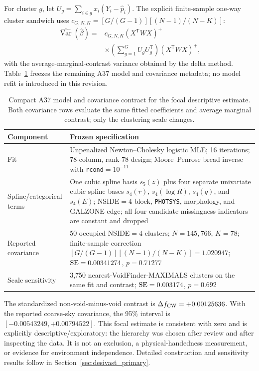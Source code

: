 \documentclass[aps,prd,twocolumn,superscriptaddress,showpacs,preprintnumbers,nofootinbib,longbibliography,floatfix]{revtex4-2}
\begin{document}
For cluster $g$, let
$U_g=\sum_{i\in g}x_i(Y_i-\widehat p_i)$. The explicit finite-sample
one-way cluster sandwich uses
$c_{G,N,K}=[G/(G-1)][(N-1)/(N-K)]$:
\begin{equation}
\begin{aligned}
\widehat{\operatorname{Var}}(\widehat\beta)
={}&c_{G,N,K}(X^{\mathsf T}WX)^{+} \\
&\times\left(\sum_{g=1}^{G}U_gU_g^{\mathsf T}\right)
(X^{\mathsf T}WX)^{+},
\end{aligned}
\label{eq:focal_sandwich}
\end{equation}
with the average-marginal-contrast variance obtained by the delta method.
Table~\ref{tab:focal_model_contract} freezes the remaining A37 model and
covariance metadata; no model refit is introduced in this revision.

\begin{table}[!t]
\caption{Compact A37 model and covariance contract for the focal
descriptive estimate. Both covariance rows evaluate the same fitted
coefficients and average marginal contrast; only the clustering scale
changes.}
\label{tab:focal_model_contract}
\begin{ruledtabular}
\begin{tabular}{p{}p{}}
Component & Frozen specification \\
\hline
Fit & Unpenalized Newton--Cholesky logistic MLE; 16 iterations; 78-column, rank-78 design; Moore--Penrose bread inverse with \texttt{rcond}$=10^{-11}$ \\
Spline/categorical terms & One cubic spline basis $s_5(z)$ plus four separate univariate cubic spline bases $s_4(r)$, $s_4(\log R)$, $s_4(q)$, and $s_4(E)$; NSIDE$=4$ block, \texttt{PHOTSYS}, morphology, and GALZONE edge; all four candidate missingness indicators are constant and dropped \\
Reported covariance & 50 occupied NSIDE$=4$ clusters; $N=145{,}766$, $K=78$; finite-sample correction $[G/(G-1)][(N-1)/(N-K)]=1.020947$; ${\rm SE}=0.00341274$, $p=0.71277$ \\
Scale sensitivity & 3,750 nearest-VoidFinder-MAXIMALS clusters on the same fit and contrast; ${\rm SE}=0.003174$, $p=0.692$ \\
\end{tabular}
\end{ruledtabular}
\end{table}

The standardized non-void-minus-void contrast is
$\Delta f_{\rm CW}=+0.00125636$. With the reported coarse-sky covariance,
the 95\% interval is $[-0.00543249,+0.00794522]$. This focal estimate is
consistent with zero and is explicitly descriptive/exploratory: the
hierarchy was chosen after review and after inspecting the data. It is
not an exclusion, a physical-handedness measurement, or evidence for
environment independence. Detailed construction and sensitivity results
follow in Section~\ref{sec:desivast_primary}.
\end{document}
